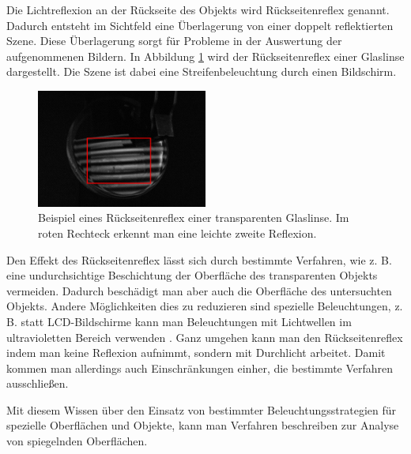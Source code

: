 \noindent
Die Lichtreflexion an der Rückseite des Objekts wird Rückseitenreflex genannt.
Dadurch entsteht im Sichtfeld eine Über\-la\-ge\-rung von einer doppelt reflektierten Szene.
Diese Über\-la\-ge\-rung sorgt für Probleme in der Auswertung der aufgenommenen Bildern.
In Abbildung \ref{img:rueckseitenreflexBeispiel} wird der Rückseitenreflex einer Glaslinse dargestellt.
Die Szene ist dabei eine Streifenbeleuchtung durch einen Bildschirm.

\begin{figure}[H]
	\centering
	\includegraphics[width=0.5\textwidth]{02_grundlagenDerDeflektometrie/spiegelndeOberflaechen/figures/rueckseitenreflexBeispiel}
	\caption[Beispiel Rückseitenreflex]{Beispiel eines Rückseitenreflex einer transparenten Glaslinse. Im roten Rechteck erkennt man eine leichte zweite Reflexion.}
	\label{img:rueckseitenreflexBeispiel}
\end{figure}

\noindent
Den Effekt des Rückseitenreflex lässt sich durch bestimmte Verfahren, wie z. B. eine undurchsichtige Beschichtung der Oberfläche des transparenten Objekts vermeiden.
Dadurch beschädigt man aber auch die Oberfläche des untersuchten Objekts.
Andere Mög\-lich\-keiten dies zu reduzieren sind spezielle Beleuchtungen, z. B. statt LCD-Bildschirme kann man Beleuchtungen mit Lichtwellen im ultravioletten Bereich verwenden \cite{invisionUVDeflektometrie}.
Ganz umgehen kann man den Rückseitenreflex indem man keine Reflexion aufnimmt, sondern mit Durchlicht arbeitet.
Damit kommen man allerdings auch Einschränkungen einher, die bestimmte Verfahren ausschließen.

\p
Mit diesem Wissen über den Einsatz von bestimmter Beleuchtungsstrategien für spezielle Oberflächen und Objekte, kann man Verfahren beschreiben zur Analyse von spiegelnden Oberflächen.